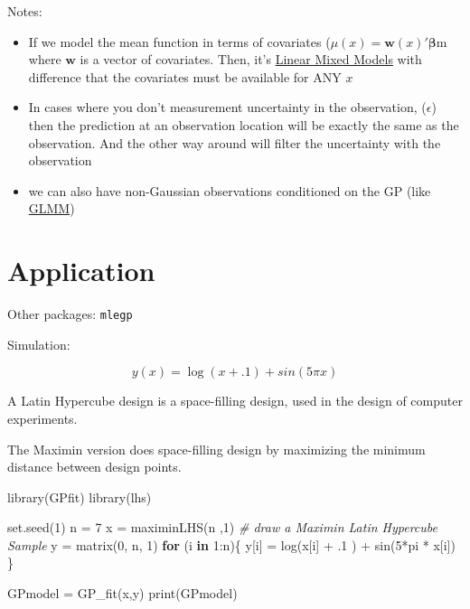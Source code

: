 \documentclass[
]{book}
\newenvironment{Shaded}{\begin{snugshade}}{\end{snugshade}}
\newcommand{\CommentTok}[1]{\textcolor[rgb]{0.56,0.35,0.01}{\textit{#1}}}
\newcommand{\ControlFlowTok}[1]{\textcolor[rgb]{0.13,0.29,0.53}{\textbf{#1}}}
\newcommand{\DecValTok}[1]{\textcolor[rgb]{0.00,0.00,0.81}{#1}}
\newcommand{\FunctionTok}[1]{\textcolor[rgb]{0.00,0.00,0.00}{#1}}
\newcommand{\NormalTok}[1]{#1}
\newcommand{\OtherTok}[1]{\textcolor[rgb]{0.56,0.35,0.01}{#1}}
\newcommand{\SpecialCharTok}[1]{\textcolor[rgb]{0.00,0.00,0.00}{#1}}
\begin{document}
Notes:

\begin{itemize}
\item
  If we model the mean function in terms of covariates (\(\mu(x) = \mathbf{w}(x)'\mathbf{\beta}\)m where \(\mathbf{w}\) is a vector of covariates. Then, it's \href{https://bookdown.org/mike/data_analysis/linear-mixed-models.html}{Linear Mixed Models} with difference that the covariates must be available for ANY \(x\)
\item
  In cases where you don't measurement uncertainty in the observation, (\(\epsilon\)) then the prediction at an observation location will be exactly the same as the observation. And the other way around will filter the uncertainty with the observation
\item
  we can also have non-Gaussian observations conditioned on the GP (like \href{https://bookdown.org/mike/data_analysis/nonlinear-and-generalized-linear-mixed-models.html}{GLMM})
\end{itemize}

\hypertarget{application-3}{%
\section{Application}\label{application-3}}

Other packages: \texttt{mlegp}

\citet{macdonald2015}

Simulation:

\[
y(x) = \log(x + .1) + sin(5 \pi x)
\]

A Latin Hypercube design is a space-filling design, used in the design of computer experiments.

The Maximin version does space-filling design by maximizing the minimum distance between design points.

\begin{Shaded}
\begin{Highlighting}[]
\FunctionTok{library}\NormalTok{(GPfit)}
\FunctionTok{library}\NormalTok{(lhs)}
    
\FunctionTok{set.seed}\NormalTok{(}\DecValTok{1}\NormalTok{)}
\NormalTok{n }\OtherTok{=} \DecValTok{7}
\NormalTok{x }\OtherTok{=} \FunctionTok{maximinLHS}\NormalTok{(n ,}\DecValTok{1}\NormalTok{) }\CommentTok{\# draw a Maximin Latin Hypercube Sample}
\NormalTok{y }\OtherTok{=} \FunctionTok{matrix}\NormalTok{(}\DecValTok{0}\NormalTok{, n, }\DecValTok{1}\NormalTok{)}
\ControlFlowTok{for}\NormalTok{ (i }\ControlFlowTok{in} \DecValTok{1}\SpecialCharTok{:}\NormalTok{n)\{}
\NormalTok{    y[i] }\OtherTok{=} \FunctionTok{log}\NormalTok{(x[i] }\SpecialCharTok{+}\NormalTok{ .}\DecValTok{1}\NormalTok{ ) }\SpecialCharTok{+} \FunctionTok{sin}\NormalTok{(}\DecValTok{5}\SpecialCharTok{*}\NormalTok{pi }\SpecialCharTok{*}\NormalTok{ x[i])}
\NormalTok{\}}

\NormalTok{GPmodel }\OtherTok{=} \FunctionTok{GP\_fit}\NormalTok{(x,y)}
\FunctionTok{print}\NormalTok{(GPmodel)}
\end{Highlighting}
\end{Shaded}
\end{document}
